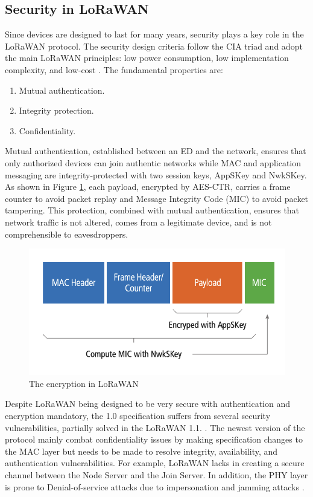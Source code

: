 \subsection{Security in LoRaWAN}
Since devices are designed to last for many years, security plays a key role in the LoRaWAN protocol. The security design criteria follow the CIA triad and adopt the main LoRaWAN principles: low power consumption, low implementation complexity, and low-cost \cite{lorawan_security}. The fundamental properties are:
\begin{enumerate}
	\item Mutual authentication.
	\item Integrity protection. 
	\item Confidentiality.
\end{enumerate}
Mutual authentication, established between an ED and the network, ensures that only authorized devices can join authentic networks while MAC and application messaging are integrity-protected with two session keys, AppSKey and NwkSKey. As shown in Figure \ref{fig:encryption}, each payload, encrypted by AES-CTR, carries a frame counter to avoid packet replay and Message Integrity Code (MIC) to avoid packet tampering. This protection, combined with mutual authentication, ensures that network traffic is not altered, comes from a legitimate device, and is not comprehensible to eavesdroppers. 
\begin{figure}[H]
    \centering
    \includegraphics[width=0.7\linewidth]{images/threat/encryption.png}
    \caption{The encryption in LoRaWAN}
    \label{fig:encryption}
\end{figure}
Despite LoRaWAN being designed to be very secure with authentication and encryption mandatory, the 1.0 specification suffers from several security vulnerabilities, partially solved in the LoRaWAN 1.1. \cite{8117042}. The newest version of the protocol mainly combat confidentiality issues by making specification changes to the MAC layer but needs to be made to resolve integrity, availability, and authentication vulnerabilities. For example, LoRaWAN lacks in creating a secure channel between the Node Server and the Join Server. In addition, the PHY layer is prone to Denial-of-service attacks due to impersonation and jamming attacks \cite{9356425}. 



